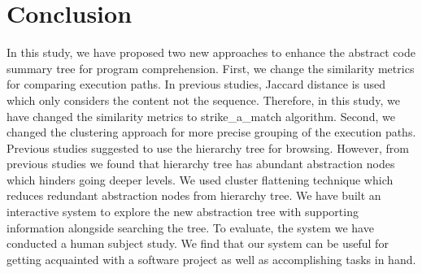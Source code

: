 \section{Conclusion}
In this study, we have proposed two new approaches to enhance the abstract code summary tree for program comprehension. First, we change the similarity metrics for comparing execution paths. In previous studies, Jaccard distance is used which only considers the content not the sequence. Therefore, in this study, we have changed the similarity metrics to strike\_a\_match algorithm. Second, we changed the clustering approach for more precise grouping of the execution paths. Previous studies suggested to use the hierarchy tree for browsing. However, from previous studies we found that hierarchy tree has abundant abstraction nodes which hinders going deeper levels.
We used cluster flattening technique which reduces redundant abstraction nodes from hierarchy tree. We have built an interactive system to explore the new abstraction tree with supporting information alongside searching the tree. To evaluate, the system we have conducted a human subject study. We find that our system can be useful for getting acquainted with a software project as well as accomplishing tasks in hand.  
